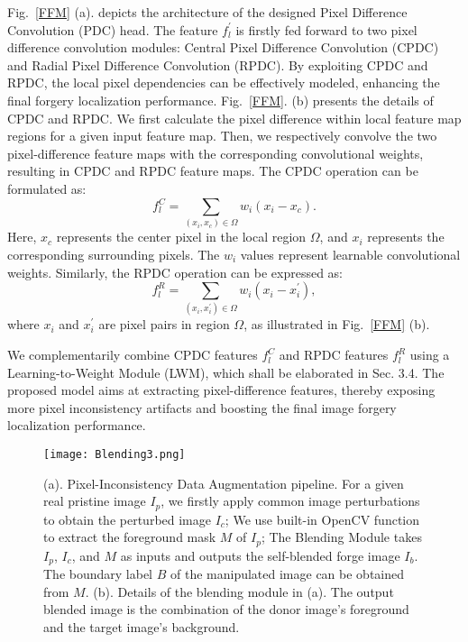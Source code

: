 \documentclass[10pt,journal,compsoc]{IEEEtran}
\begin{document}
Fig.~\ref{FFM} (a). depicts the architecture of the designed Pixel Difference Convolution (PDC) head. The feature $f_{l}^{'}$ is firstly fed forward to two 
pixel difference convolution modules: Central Pixel Difference Convolution (CPDC) and Radial Pixel Difference Convolution (RPDC). By exploiting CPDC and RPDC, the local pixel dependencies can be effectively modeled, enhancing the final forgery localization performance. Fig.~\ref{FFM}. (b) presents the details of CPDC and RPDC. We first calculate the pixel difference within local feature map regions for a given input feature map. Then, we respectively convolve the two pixel-difference feature maps with the corresponding convolutional weights, resulting in CPDC and RPDC feature maps. The CPDC operation can be formulated as:
\begin{equation}
     f_{l}^{C} = \sum_{(x_{i},x_{c})\in {\Omega}} {w_{i}(x_{i}-x_{c})}.
\end{equation}
Here, $x_{c}$ represents the center pixel in the local region $\Omega$, and $x_{i}$ represents the corresponding surrounding pixels. The $w_{i}$ values represent learnable convolutional weights. Similarly, the RPDC operation can be expressed as:
\begin{equation}
     f_{l}^{R} = \sum_{(x_{i},x_{i}^{'})\in {\Omega}} {w_{i}(x_{i}-x_{i}^{'})},
\end{equation}
where $x_{i}$ and $x_{i}^{'}$ are pixel pairs in region ${\Omega}$, as illustrated in Fig.~\ref{FFM} (b). 

We complementarily combine CPDC features $f_{l}^{C}$ and RPDC features $f_{l}^{R}$ using a Learning-to-Weight Module (LWM), which shall be elaborated in Sec. 3.4.
The proposed model aims at extracting pixel-difference features, thereby exposing more pixel inconsistency artifacts and boosting the final image forgery localization performance.  

\begin{figure*}[ht]
\centering
\texttt{[image:  Blending3.png]}
\caption{(a). Pixel-Inconsistency Data Augmentation pipeline.  For a given real pristine image $I_{p}$, we firstly apply common image perturbations to obtain the perturbed image $I_{c}$;  We use built-in OpenCV function to extract the foreground mask $M$ of $I_{p}$; The Blending Module takes $I_{p}$, $I_{c}$, and $M$ as inputs and outputs the self-blended forge image $I_{b}$.  The boundary label $B$ of the manipulated image can be obtained from $M$. (b). Details of the blending module in (a). The output blended image is the combination of the donor image's foreground and the target image's background.}
\label{Selfblending}
\end{figure*}
\end{document}
